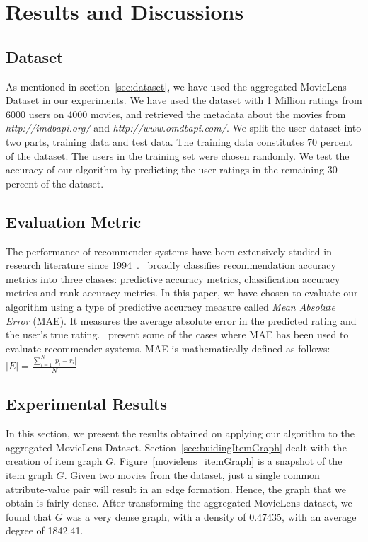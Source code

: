 \documentclass{acm_proc_article-sp}
\begin{document}

\section{Results and Discussions}
\label{sec:results}
\subsection{Dataset}
As mentioned in section~\ref{sec:dataset}, we have used the aggregated MovieLens Dataset in our experiments. We have used the dataset with 1 Million ratings from 6000 users on 4000 movies, and retrieved the metadata about the movies from\\
\emph{http://imdbapi.org/} and \emph{http://www.omdbapi.com/}. We split the user dataset into two parts, training data and test data. The training data constitutes 70 percent of the dataset. The users in the training set were chosen randomly. We test the accuracy of our algorithm by predicting the user ratings in the remaining 30 percent of the dataset.

\subsection{Evaluation Metric}

The performance of recommender systems have been extensively studied in research literature since 1994~\cite{resnick}.~\cite{jonathan} broadly classifies recommendation accuracy metrics into three classes: predictive accuracy metrics, classification accuracy metrics and rank accuracy metrics. In this paper, we have chosen to evaluate our algorithm using a type of predictive accuracy measure called \emph{Mean Absolute Error} (MAE). It measures the average absolute error in the predicted rating and the user's true rating.~\cite{breese, shardanand} present some of the cases where MAE has been used to evaluate recommender systems. MAE is mathematically defined as follows:\\

$|E| = \frac{\sum_{i=1}^{N}|p_i - r_i|}{N}$

\subsection{Experimental Results}
In this section, we present the results obtained on applying our algorithm to the aggregated MovieLens Dataset. Section~\ref{sec:buidingItemGraph} dealt with the creation of item graph $G$. Figure~\ref{movielens_itemGraph} is a snapshot of the item graph $G$. Given two movies from the dataset, just a single common attribute-value pair will result in an edge formation. Hence, the graph that we obtain is fairly dense. After transforming the aggregated MovieLens dataset, we found that $G$ was a very dense graph, with a density of 0.47435, with an average degree of 1842.41.
\end{document}
